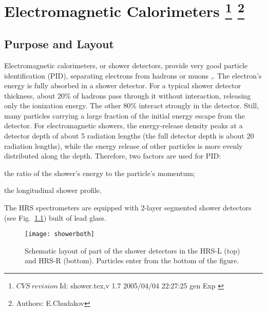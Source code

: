 \chapter[Electromagnetic Calorimeters]{Electromagnetic Calorimeters
\footnote{
  $CVS~revision~ $Id: shower.tex,v 1.7 2005/04/04 22:27:25 gen Exp $ $
}
\footnote{Authors: E.Chudakov }
}

\section{Purpose and Layout}

Electromagnetic calorimeters, or shower detectors, provide very good
particle identification (PID), separating electrons from hadrons or
muons \cite{Bartoszek:1991ex},\cite{Appel:1975tt}.  The electron's energy
is fully absorbed in a shower detector.  For a typical shower detector
thickness, about 20\% of hadrons pass through it without interaction,
releasing only the ionization energy.  The other 80\% interact
strongly in the detector. Still, many particles carrying a large
fraction of the initial energy escape from the detector. For
electromagnetic showers, the energy-release density peaks at a
detector depth of about 5 radiation lengths (the full detector depth
is about 20 radiation lengths), while the energy release of other
particles is more evenly distributed along the depth.  Therefore, two
factors are used for PID:
\begin{list}{.~}{\setlength{\itemsep}{-0.15cm}}
  \item the ratio of the shower's energy to the particle's momentum;
  \item the longitudinal shower profile.
\end{list}

The HRS spectrometers are equipped with 2-layer segmented shower
detectors (see Fig.~\ref{fig:hrs-det-shower_layout}) built of
lead glass.
\begin{figure}[htb]
\begin{center}
   \texttt{[image: showerboth]}
\end{center}
\caption[Schematic layout of part of the shower detectors in the HRS]%
{Schematic layout of part of the shower detectors in the HRS-L
(top) and HRS-R (bottom). Particles enter from the bottom of the figure.}
\label{fig:hrs-det-shower_layout}
\end{figure}
  
